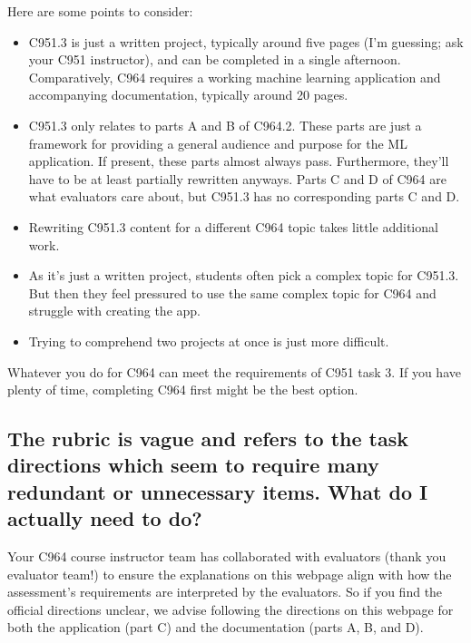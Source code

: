 \documentclass[letterpaper,10pt,english]{jupyterBook}
\begin{document}
\sphinxAtStartPar
Here are some points to consider:
\begin{itemize}
\item {} 
\sphinxAtStartPar
C951.3 is just a written project, typically around five pages (I’m guessing; ask your C951 instructor), and can be completed in a single afternoon. Comparatively, C964 requires a working machine learning application and accompanying documentation, typically around 20 pages.

\item {} 
\sphinxAtStartPar
C951.3 only relates to parts A and B of C964.2. These parts are just a framework for providing a general audience and purpose for the ML application. If present, these parts almost always pass. Furthermore, they’ll have to be at least partially rewritten anyways. Parts C and D of C964 are what evaluators care about, but C951.3 has no corresponding parts C and D.

\item {} 
\sphinxAtStartPar
Rewriting C951.3 content for a different C964 topic takes little additional work.

\item {} 
\sphinxAtStartPar
As it’s just a written project, students often pick a complex topic for C951.3. But then they feel pressured to use the same complex topic for C964 and struggle with creating the app.

\item {} 
\sphinxAtStartPar
Trying to comprehend two projects at once is just more difficult.

\end{itemize}

\sphinxAtStartPar
Whatever you do for C964 can meet the requirements of C951 task 3. If you have plenty of time, completing C964 first might be the best option.


\subsection{The rubric is vague and refers to the task directions which seem to require many redundant or unnecessary items. What do I actually need to do?}
\label{\detokenize{task2_c/task2_part_c:the-rubric-is-vague-and-refers-to-the-task-directions-which-seem-to-require-many-redundant-or-unnecessary-items-what-do-i-actually-need-to-do}}
\sphinxAtStartPar
Your C964 course instructor team has collaborated with evaluators (thank you evaluator team!) to ensure the explanations on this webpage align with how the assessment’s requirements are interpreted by the evaluators. So if you find the official directions unclear, we advise following the directions on this webpage for both the application (part C) and the documentation (parts A, B, and D).
\end{document}
